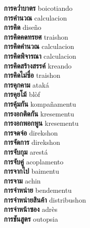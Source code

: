 \textbf{ การคว่ำบาตร  } boicotiando \\
\textbf{ การคำนวณ  } calculacion \\
\textbf{ การคิด  } diseño \\
\textbf{ การคิดคดทรยศ  } traishon \\
\textbf{ การคิดคำนวณ  } calculacion \\
\textbf{ การคิดพิจารณา  } calculacion \\
\textbf{ การคิดสร้างสรรค์  } kreando \\
\textbf{ การคิดไม่ซื่อ  } traishon \\
\textbf{ การคุกคาม  } ataká \\
\textbf{ การคุยโม้  } blòf \\
\textbf{ การคุ้มกัน  } kompañamentu \\
\textbf{ การงอกติดกัน  } kresementu \\
\textbf{ การงอกพอกพูน  } kresementu \\
\textbf{ การจดจ่อ  } direkshon \\
\textbf{ การจัดการ  } direkshon \\
\textbf{ การจับกุม  } arestá \\
\textbf{ การจับคู่  } acoplamento \\
\textbf{ การจากไป  } baimentu \\
\textbf{ การจาม  } achin \\
\textbf{ การจำหน่าย  } bendementu \\
\textbf{ การจำหน่ายสินค้า  } distribushon \\
\textbf{ การจ่าหน้าซอง  } adrès \\
\textbf{ การชันสูตร  } outopsia \\
